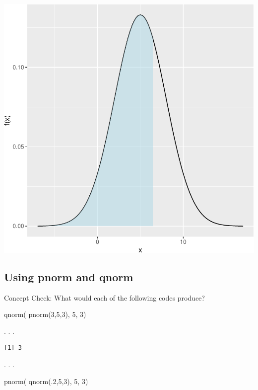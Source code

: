 \documentclass[
  letterpaper,
  DIV=11,
  numbers=noendperiod]{scrartcl}
\newenvironment{Shaded}{\begin{snugshade}}{\end{snugshade}}
\newcommand{\DecValTok}[1]{\textcolor[rgb]{0.68,0.00,0.00}{#1}}
\newcommand{\FunctionTok}[1]{\textcolor[rgb]{0.28,0.35,0.67}{#1}}
\newcommand{\NormalTok}[1]{\textcolor[rgb]{0.00,0.23,0.31}{#1}}
\begin{document}
\includegraphics[width=1\linewidth,height=\textheight,keepaspectratio]{chapter3normal_files/figure-pdf/normalQuantilePlot-1.pdf}

\subsection{Using pnorm and qnorm}\label{using-pnorm-and-qnorm}

{Concept Check:} What would each of the following codes produce?

\begin{Shaded}
\begin{Highlighting}[]
\FunctionTok{qnorm}\NormalTok{( }\FunctionTok{pnorm}\NormalTok{(}\DecValTok{3}\NormalTok{,}\DecValTok{5}\NormalTok{,}\DecValTok{3}\NormalTok{), }\DecValTok{5}\NormalTok{, }\DecValTok{3}\NormalTok{)}
\end{Highlighting}
\end{Shaded}

. . .

\begin{verbatim}
[1] 3
\end{verbatim}

. . .

\begin{Shaded}
\begin{Highlighting}[]
\FunctionTok{pnorm}\NormalTok{( }\FunctionTok{qnorm}\NormalTok{(.}\DecValTok{2}\NormalTok{,}\DecValTok{5}\NormalTok{,}\DecValTok{3}\NormalTok{), }\DecValTok{5}\NormalTok{, }\DecValTok{3}\NormalTok{)}
\end{Highlighting}
\end{Shaded}
\end{document}
